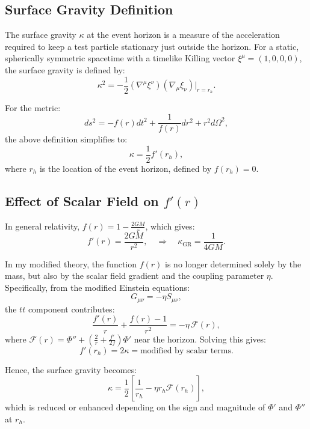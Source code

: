 \documentclass[12pt]{article}
\begin{document}
\subsection{Surface Gravity Definition}

The surface gravity \( \kappa \) at the event horizon is a measure of the acceleration required to keep a test particle stationary just outside the horizon. For a static, spherically symmetric spacetime with a timelike Killing vector \( \xi^\mu = (1, 0, 0, 0) \), the surface gravity is defined by:
\begin{equation}
\kappa^2 = -\frac{1}{2} \left( \nabla^\mu \xi^\nu \right)\left( \nabla_\mu \xi_\nu \right)\Big|_{r = r_h}.
\end{equation}

For the metric:
\[
ds^2 = -f(r) dt^2 + \frac{1}{f(r)} dr^2 + r^2 d\Omega^2,
\]
the above definition simplifies to:
\begin{equation}
\kappa = \frac{1}{2} f'(r_h),
\label{eq:surface_gravity}
\end{equation}
where \( r_h \) is the location of the event horizon, defined by \( f(r_h) = 0 \).

\subsection{Effect of Scalar Field on \( f'(r) \)}

In general relativity, \( f(r) = 1 - \frac{2GM}{r} \), which gives:
\[
f'(r) = \frac{2GM}{r^2}, \quad \Rightarrow \quad \kappa_{\text{GR}} = \frac{1}{4GM}.
\]

In my modified theory, the function \( f(r) \) is no longer determined solely by the mass, but also by the scalar field gradient and the coupling parameter \( \eta \). Specifically, from the modified Einstein equations:
\[
G_{\mu\nu} = -\eta S_{\mu\nu},
\]
the \( tt \) component contributes:
\[
\frac{f'(r)}{r} + \frac{f(r) - 1}{r^2} = -\eta \, \mathcal{F}(r),
\]
where \( \mathcal{F}(r) = \Phi'' + \left( \frac{2}{r} + \frac{f'}{2f} \right)\Phi' \) near the horizon. Solving this gives:
\[
f'(r_h) = 2\kappa = \text{modified by scalar terms}.
\]

Hence, the surface gravity becomes:
\begin{equation}
\kappa = \frac{1}{2} \left[ \frac{1}{r_h} - \eta r_h \mathcal{F}(r_h) \right],
\end{equation}
which is reduced or enhanced depending on the sign and magnitude of \( \Phi' \) and \( \Phi'' \) at \( r_h \).
\end{document}

